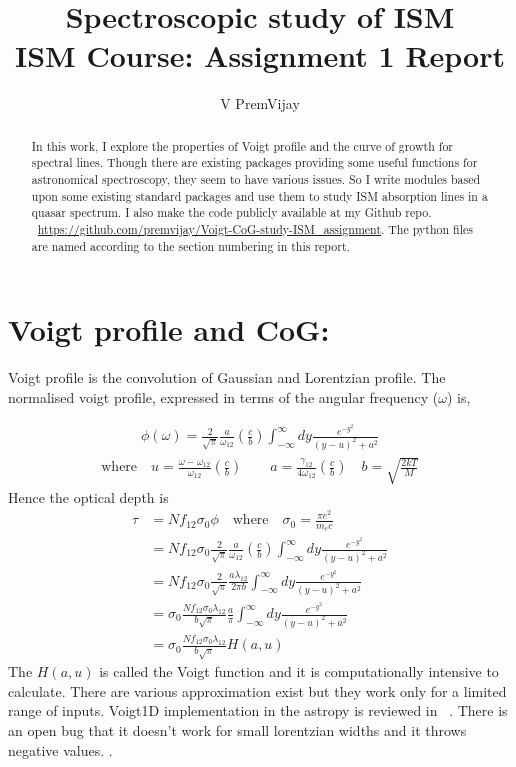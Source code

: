\documentclass[12pt]{article}
\title{Spectroscopic study of ISM \\ ISM Course: Assignment 1 Report}
\author{V PremVijay}
\begin{document}
\maketitle

\begin{abstract}
In this work, I explore the properties of Voigt profile and the curve of growth for spectral lines. Though there are existing packages providing some useful functions for astronomical spectroscopy, they seem to have various issues. So I write modules based upon some existing standard packages and use them to study ISM absorption lines in a quasar spectrum. I also make the code publicly available at my Github repo. ~\url{https://github.com/premvijay/Voigt-CoG-study-ISM_assignment}. The python files are named according to the section numbering in this report.

\end{abstract}

\section{Voigt profile and CoG:}
Voigt profile is the convolution of Gaussian and Lorentzian profile. The normalised voigt profile, expressed in terms of the angular frequency ($\omega$) is, 

\begin{align}
\phi({\omega}) = \frac{2}{\sqrt{\pi}} \frac{a}{\omega_{12}} \left( \frac{c}{b}\right)  \int_{-\infty}^{\infty} dy \frac{e^{-y^2}}{(y-u)^2+a^2}
\end{align}
\begin{align}
\text{where} \quad u = \frac{\omega - \omega_{12}}{\omega_{12}} \left( \frac{c}{b}\right) \qquad
a = \frac{\gamma_{12}}{4\omega_{12}} \left( \frac{c}{b}\right)\quad
b = \sqrt{\frac{2kT}{M}}
\end{align}
Hence the optical depth is
\begin{align}
\tau &= N f_{12} \sigma_0 \phi  \quad \text{where} \quad \sigma_0 = \frac{\pi e^2}{m_e c}\\
&= N f_{12} \sigma_0 \frac{2}{\sqrt{\pi}} \frac{a}{\omega_{12}} \left( \frac{c}{b}\right)  \int_{-\infty}^{\infty} dy \frac{e^{-y^2}}{(y-u)^2+a^2}\\
&=  N f_{12} \sigma_0 \frac{2}{\sqrt{\pi}} \frac{a \lambda_{12}}{2\pi b}  \int_{-\infty}^{\infty} dy \frac{e^{-y^2}}{(y-u)^2+a^2}\\
&= \sigma_0 \frac{ N f_{12} \sigma_0 \lambda_{12}}{b\sqrt{\pi}} \frac{a }{\pi}  \int_{-\infty}^{\infty} dy \frac{e^{-y^2}}{(y-u)^2+a^2}\\
&= \sigma_0 \frac{ N f_{12} \sigma_0 \lambda_{12}}{b\sqrt{\pi}} H(a,u)
\end{align}
%
The $H(a,u)$ is called the Voigt function and it is computationally intensive to calculate. There are various approximation exist but they work only for a limited range of inputs. Voigt1D implementation in the astropy is reviewed in~ \cite{Voigt1D_comments}. There is an open bug that it doesn't work for small lorentzian widths and it throws negative values. \cite{Voigt1D-bug}.\\
\end{document}
